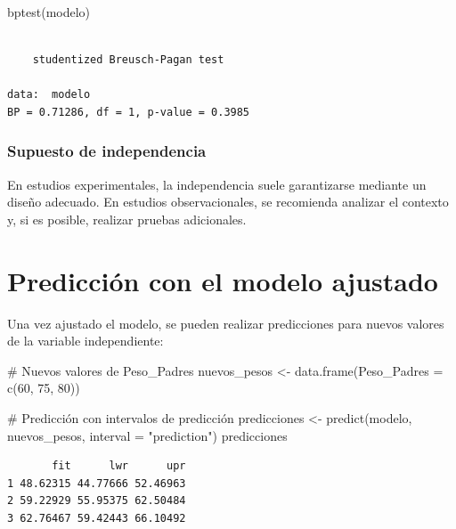\documentclass[
  spanish,
  letterpaper,
]{book}
\newenvironment{Shaded}{\begin{snugshade}}{\end{snugshade}}
\newcommand{\AttributeTok}[1]{\textcolor[rgb]{0.40,0.45,0.13}{#1}}
\newcommand{\CommentTok}[1]{\textcolor[rgb]{0.37,0.37,0.37}{#1}}
\newcommand{\DecValTok}[1]{\textcolor[rgb]{0.68,0.00,0.00}{#1}}
\newcommand{\FunctionTok}[1]{\textcolor[rgb]{0.28,0.35,0.67}{#1}}
\newcommand{\NormalTok}[1]{\textcolor[rgb]{0.00,0.23,0.31}{#1}}
\newcommand{\OtherTok}[1]{\textcolor[rgb]{0.00,0.23,0.31}{#1}}
\newcommand{\StringTok}[1]{\textcolor[rgb]{0.13,0.47,0.30}{#1}}
\begin{document}
\begin{Shaded}
\begin{Highlighting}[]
\FunctionTok{bptest}\NormalTok{(modelo)}
\end{Highlighting}
\end{Shaded}

\begin{verbatim}

    studentized Breusch-Pagan test

data:  modelo
BP = 0.71286, df = 1, p-value = 0.3985
\end{verbatim}

\subsubsection{Supuesto de
independencia}\label{supuesto-de-independencia}

En estudios experimentales, la independencia suele garantizarse mediante
un diseño adecuado. En estudios observacionales, se recomienda analizar
el contexto y, si es posible, realizar pruebas adicionales.

\section{Predicción con el modelo
ajustado}\label{predicciuxf3n-con-el-modelo-ajustado}

Una vez ajustado el modelo, se pueden realizar predicciones para nuevos
valores de la variable independiente:

\begin{Shaded}
\begin{Highlighting}[]
\CommentTok{\# Nuevos valores de Peso\_Padres}
\NormalTok{nuevos\_pesos }\OtherTok{\textless{}{-}} \FunctionTok{data.frame}\NormalTok{(}\AttributeTok{Peso\_Padres =} \FunctionTok{c}\NormalTok{(}\DecValTok{60}\NormalTok{, }\DecValTok{75}\NormalTok{, }\DecValTok{80}\NormalTok{))}

\CommentTok{\# Predicción con intervalos de predicción}
\NormalTok{predicciones }\OtherTok{\textless{}{-}} \FunctionTok{predict}\NormalTok{(modelo, nuevos\_pesos, }\AttributeTok{interval =} \StringTok{"prediction"}\NormalTok{)}
\NormalTok{predicciones}
\end{Highlighting}
\end{Shaded}

\begin{verbatim}
       fit      lwr      upr
1 48.62315 44.77666 52.46963
2 59.22929 55.95375 62.50484
3 62.76467 59.42443 66.10492
\end{verbatim}
\end{document}
